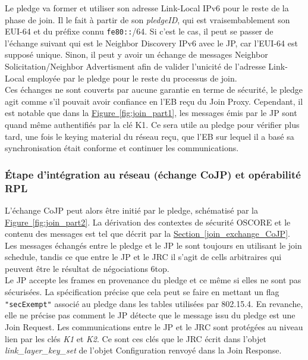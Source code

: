 \documentclass[]{report}
\newcommand{\wordlink}[2]{\hyperref[#2]{#1~\ref{#2}}}
\begin{document}
Le pledge va former et utiliser son adresse Link-Local IPv6 pour le reste de la phase de join. Il le fait à partir de son \textit{pledgeID}, qui est vraisembablement son EUI-64 et du préfixe connu \texttt{fe80::}/64. Si c'est le cas, il peut se passer de l'échange suivant qui est le Neighbor Discovery IPv6 avec le JP, car l'EUI-64 est supposé unique. Sinon, il peut y avoir un échange de messages Neighbor Solicitation/Neighbor Advertisment afin de valider l'unicité de l'adresse Link-Local employée par le pledge pour le reste du processus de join.\\

Ces échanges ne sont couverts par aucune garantie en terme de sécurité, le pledge agit comme s'il pouvait avoir confiance en l'EB reçu du Join Proxy. Cependant, il est notable que dans la \wordlink{Figure}{fig:join_part1}, les messages émis par le JP sont quand même authentifiés par la clé K1. Ce sera utile au pledge pour vérifier plus tard, une fois le keying material du réseau reçu, que l'EB sur lequel il a basé sa synchronisation était conforme et continuer les communications. 

\newpage

\subsubsection{Étape d'intégration au réseau (échange CoJP) et opérabilité RPL}
\label{global_CoJP}

L'échange CoJP peut alors être initié par le pledge, schématisé par la \wordlink{Figure}{fig:join_part2}. La dérivation des contextes de sécurité OSCORE et le contenu des messages est tel que décrit par la \wordlink{Section}{join_exchange_CoJP}. Les messages échangés entre le pledge et le JP le sont toujours en utilisant le join schedule, tandis ce que entre le JP et le JRC il s'agit de cells arbitraires qui peuvent être le résultat de négociations 6top.\\

Le JP accepte les frames en provenance du pledge et ce même si elles ne sont pas sécurisées. La spécification \cite{ietf-6tisch-minimal-security-15} précise que cela peut se faire en mettant un flag \texttt{"secExempt"} associé au pledge dans les tables utilisées par 802.15.4. En revanche, elle ne précise pas comment le JP détecte que le message issu du pledge est une Join Request. Les communications entre le JP et le JRC sont protégées au niveau lien par les clés \textit{K1} et \textit{K2}. Ce sont ces clés que le JRC écrit dans l'objet \textit{link\_layer\_key\_set} de l'objet Configuration renvoyé dans la Join Response.
\end{document}
